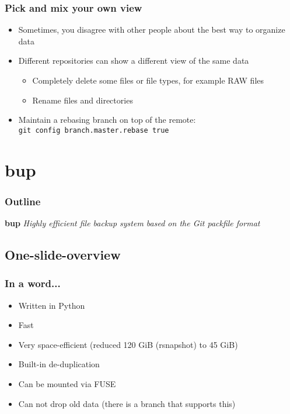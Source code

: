 \documentclass[t]{beamer}
\begin{document}
\begin{frame}
	\frametitle{Pick and mix your own view}
	\begin{itemize}
		\item Sometimes, you disagree with other people about the best way to organize data
		\item Different repositories can show a different view of the same data
			\begin{itemize}
				\item Completely delete some files or file types, for example RAW files
				\item Rename files and directories
			\end{itemize}
		\item Maintain a rebasing branch on top of the remote: \\
		\texttt{git config branch.master.rebase true}
	\end{itemize}
\end{frame}


\section{bup}

\begin{frame}
	\frametitle{Outline}
	\tableofcontents[currentsection]
\end{frame}

\begin{frame}
		\begin{center}
			\vfill
			\vfill
			\textbf{bup}
			\vfill
			\textit{Highly efficient file backup system based on the Git packfile format}
			\vfill
			\vfill
		\end{center}
\end{frame}

\subsection{One-slide-overview}

\begin{frame}
	\frametitle{In a word...}
	\begin{itemize}
		\item Written in Python
		\item Fast
		\item Very space-efficient (reduced 120 GiB (rsnapshot) to 45 GiB)
		\item Built-in de-duplication
		\item Can be mounted via FUSE
		\item Can not drop old data (there is a branch that supports this)
	\end{itemize}
\end{frame}
\end{document}
